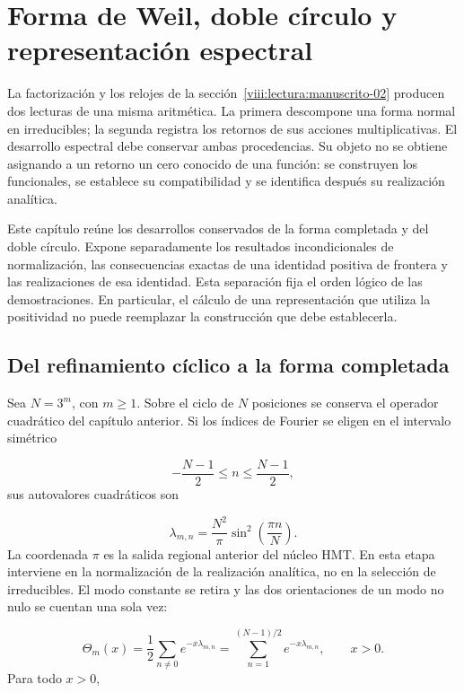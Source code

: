 \section{Forma de Weil, doble círculo y representación espectral}
\label{viii:lectura:manuscrito-03}
La factorización y los relojes de la sección~\ref{viii:lectura:manuscrito-02} producen dos lecturas de una misma aritmética. La primera descompone una forma normal en irreducibles; la segunda registra los retornos de sus acciones multiplicativas. El desarrollo espectral debe conservar ambas procedencias. Su objeto no se obtiene asignando a un retorno un cero conocido de una función: se construyen los funcionales, se establece su compatibilidad y se identifica después su realización analítica.

Este capítulo reúne los desarrollos conservados de la forma completada y del doble círculo. Expone separadamente los resultados incondicionales de normalización, las consecuencias exactas de una identidad positiva de frontera y las realizaciones de esa identidad. Esta separación fija el orden lógico de las demostraciones. En particular, el cálculo de una representación que utiliza la positividad no puede reemplazar la construcción que debe establecerla.

\subsection{Del refinamiento cíclico a la forma completada}
Sea \(N=3^m\), con \(m\geq1\). Sobre el ciclo de \(N\) posiciones se conserva el operador cuadrático del capítulo anterior. Si los índices de Fourier se eligen en el intervalo simétrico

\[
-\frac{N-1}{2}\leq n\leq\frac{N-1}{2},
\]
sus autovalores cuadráticos son

\[
\lambda_{m,n}=\frac{N^2}{\pi}\sin^2\!\left(\frac{\pi n}{N}\right).
\]
La coordenada \(\pi\) es la salida regional anterior del núcleo HMT. En esta etapa interviene en la normalización de la realización analítica, no en la selección de irreducibles. El modo constante se retira y las dos orientaciones de un modo no nulo se cuentan una sola vez:

\[
\Theta_m(x)=\frac12\sum_{n\neq0}e^{-x\lambda_{m,n}}
=\sum_{n=1}^{(N-1)/2}e^{-x\lambda_{m,n}},\qquad x>0.
\]
Para todo \(x>0\),

